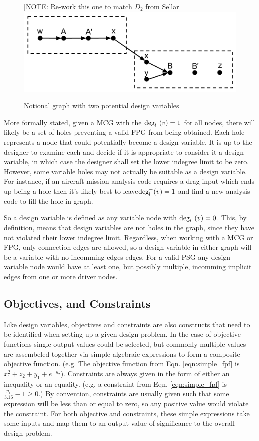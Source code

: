 \begin{figure}[htb!]
  \begin{center}
  [NOTE: Re-work this one to match $D_2$ from Sellar]
    \includegraphics[width=.6\textwidth]{images/design_vars_graph}
  \end{center}
  \caption{Notional graph with two potential design variables \label{f:designvars}}
\end{figure}

More formally stated, given a MCG with the $\textrm{deg}_l^-(v)=1$ for all nodes, 
there will likely be a set of holes preventing a valid FPG from being obtained. 
Each hole represents a node that could potentially become a design variable. 
It is up to the designer to examine each and decide if it is appropriate to 
consider it a design variable, in which case the designer shall set the lower 
indegree limit to be zero. However, some variable holes may not actually be 
suitable as a design variable. For instance, if an aircraft mission analysis 
code requires a drag input which ends up being a hole then it's likely best to 
leave$\textrm{deg}_l^-(v)=1$ and find a new analysis code to fill the hole in graph. 

So a design variable is defined as any variable node with $\textrm{deg}_l^-(v)=0$. 
This, by definition, means that design variables are not holes in the graph, since 
they have not violated their lower indegree limit. Regardless, 
when working with a MCG or FPG, only connection edges are allowed, so a design 
variable in either graph will be a variable with no incomming edges edges. For a valid PSG 
any design variable node would have at least one, but possibly multiple, incomming 
implicit edges from one or more driver nodes. 

\subsection{Objectives, and Constraints}
\label{ss:objectives and constraints}
Like design variables, objectives and constraints are also constructs that need 
to be identified when setting up a given design problem. In the case of 
objective functions single output values could be selected, but commonly multiple 
values are assembeled together via simple algebraic expressions to form a composite 
objective function. (e.g. The objective function from Eqn. \ref{eqn:simple_fpf} is
$x_1^2+z_2+y_1+e^{-y_2}$). Constraints are always given in the 
form of either an inequality or an equality. (e.g. a constraint from Eqn. 
\ref{eqn:simple_fpf} is $\frac{y_1}{3.16}-1\geq0$.) By convention, 
constraints are usually given such that some expression will be less than or equal 
to zero, so any positive value would violate the constraint. For both objective 
and constraints, these simple expressions take some inputs and map them to an
output value of significance to the overall design problem. 

